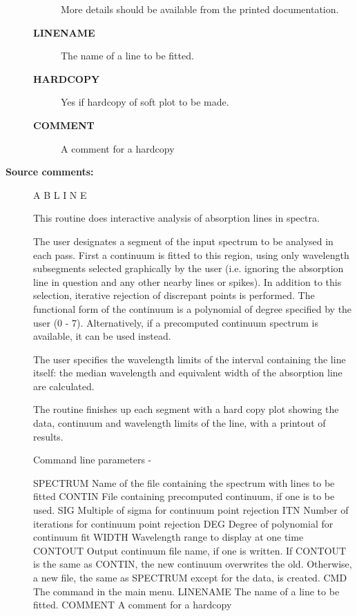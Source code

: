 \begin{description}
\begin{description}
 More details should be available from the printed documentation.
\item [\textbf{LINENAME}]
 The name of a line to be fitted.
\item [\textbf{HARDCOPY}]
 Yes if hardcopy of soft plot to be made.
\item [\textbf{COMMENT}]
 A comment for a hardcopy
\end{description}

\item [\textbf{Source comments:}]
 A B L I N E

 This routine does interactive analysis of absorption lines in spectra.

 The user designates a segment of the input spectrum to
 be analysed in each pass.  First a continuum is fitted to this
 region, using only wavelength subsegments selected graphically
 by the user (i.e. ignoring the absorption line in question and any
 other nearby lines or spikes).  In addition to this selection,
 iterative rejection of discrepant points is performed.  The functional
 form of the continuum is a polynomial of degree specified by the
 user (0 - 7).  Alternatively, if a precomputed continuum spectrum
 is available, it can be used instead.

 The user specifies the wavelength limits of the interval containing
 the line itself: the median wavelength and equivalent width of the
 absorption line are calculated.

 The routine finishes up each segment with a hard copy plot showing
 the data, continuum and wavelength limits of the line, with a
 printout of results.

 Command line parameters -

 SPECTRUM    Name of the file containing the spectrum with
             lines to be fitted
 CONTIN      File containing precomputed continuum, if one is
             to be used.
 SIG         Multiple of sigma for continuum point rejection
 ITN         Number of iterations for continuum point rejection
 DEG         Degree of polynomial for continuum fit
 WIDTH       Wavelength range to display at one time
 CONTOUT     Output continuum file name, if one is written.  If
             CONTOUT is the same as CONTIN, the new continuum
             overwrites the old.  Otherwise, a new file, the same
             as SPECTRUM except for the data, is created.
 CMD         The command in the main menu.
 LINENAME    The name of a line to be fitted.
 COMMENT     A comment for a hardcopy


\end{description}
